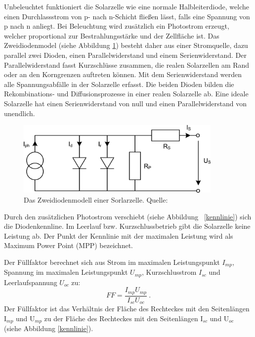 \documentclass[a4paper,bibtotoc,oneside]{scrbook}
\begin{document}
\noindent Unbeleuchtet funktioniert die Solarzelle wie eine normale Halbleiterdiode, welche einen Durchlassstrom von p- nach n-Schicht fließen lässt, falls eine Spannung von p nach n anliegt. Bei Beleuchtung wird zusätzlich ein Photostrom erzeugt, welcher proportional zur Bestrahlungsstärke und der Zellfläche ist. Das Zweidiodenmodel (siehe Abbildung \ref{esb}) besteht daher aus einer Stromquelle, dazu parallel zwei Dioden, einen Parallelwiderstand und einem Serienwiderstand. Der Parallelwiderstand fasst Kurzschlüsse zusammen, die realen Solarzellen am Rand oder an den Korngrenzen auftreten können. Mit dem Serienwiderstand werden alle Spannungsabfälle in der Solarzelle erfasst. Die beiden Dioden bilden die Rekombinations- und Diffusionsprozesse in einer realen Solarzelle ab. Eine ideale Solarzelle hat einen Serienwiderstand von null und einen Parallelwiderstand von unendlich. 
\begin{figure}[htbp]
\centering
\includegraphics[width=100mm]{img/esb2.png}
\caption{Das Zweidiodenmodell einer Sorlarzelle. Quelle: \cite{pv}}\label{esb}
\end{figure}

Durch den zusätzlichen Photostrom verschiebt (siehe Abbildung ~\ref{kennlinie}) sich die Diodenkennline. Im Leerlauf  bzw. Kurzschlussbetrieb gibt die Solarzelle keine Leistung ab. Der Punkt der Kennlinie mit der maximalen Leistung wird als Maximum Power Point (MPP) bezeichnet.

Der Füllfaktor berechnet sich aus Strom im maximalen Leistungspunkt $I_{mp}$, Spannung im maximalen Leistungspunkt $U_{mp}$, Kurzschlusstrom $I_{sc}$ und Leerlaufspannung $U_{oc}$ zu:
  \begin{equation}
     FF = \frac {I_{mp} U_{mp}} {I_{sc} U_{oc}}~.
  \end{equation}
\noindent Der Füllfaktor ist das Verhältnis der Fläche des Rechteckes mit den Seitenlängen I$_{mp}$ und U$_{mp}$ zu der Fläche des Rechteckes mit den Seitenlängen I$_{sc}$ und U$_{oc}$ (siehe Abbildung \ref{kennlinie}).
\end{document}

